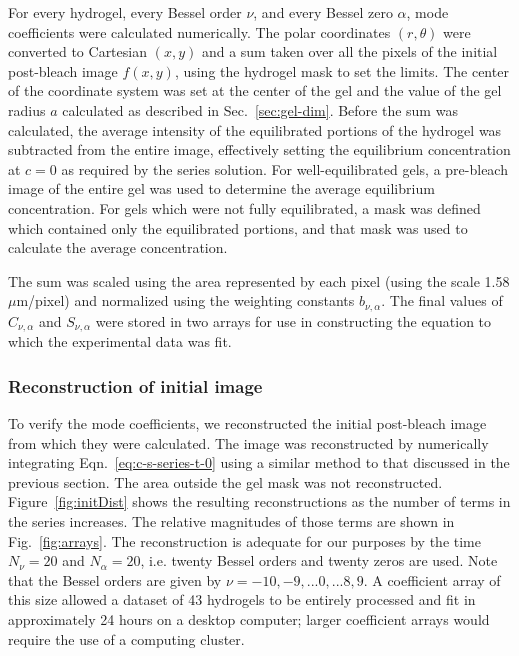 For every hydrogel, every Bessel order $\nu$, and every Bessel zero $\alpha$, mode coefficients were calculated numerically.  The polar coordinates $(r,\theta)$ were converted to Cartesian $(x,y)$ and a sum taken over all the pixels of the initial post-bleach image $f(x,y)$, using the hydrogel mask to set the limits.  The center of the coordinate system was set at the center of the gel and the value of the gel radius $a$ calculated as described in Sec.~\ref{sec:gel-dim}. Before the sum was calculated, the average intensity of the equilibrated portions of the hydrogel was subtracted from the entire image, effectively setting the equilibrium concentration at $c=0$ as required by the series solution.  For well-equilibrated gels, a pre-bleach image of the entire gel was used to determine the average equilibrium concentration.  For gels which were not fully equilibrated, a mask was defined which contained only the equilibrated portions, and that mask was used to calculate the average concentration.

The sum was scaled using the area represented by each pixel (using the scale 1.58 $\mu$m/pixel) and normalized using the weighting constants $b_{\nu,\alpha}$.  The final values of $C_{\nu,\alpha}$ and $S_{\nu,\alpha}$ were stored in two arrays for use in constructing the equation to which the experimental data was fit.


\subsubsection{Reconstruction of initial image}

To verify the mode coefficients, we reconstructed the initial post-bleach image from which they were calculated.  The image was reconstructed by numerically integrating Eqn.~\ref{eq:c-s-series-t-0} using a similar method to that discussed in the previous section.  The area outside the gel mask was not reconstructed.  Figure~\ref{fig:initDist} shows the resulting reconstructions as the number of terms in the series increases.  The relative magnitudes of those terms are shown in Fig.~\ref{fig:arrays}.  The reconstruction is adequate for our purposes by the time $N_\nu = 20$ and $N_\alpha = 20$, i.e. twenty Bessel orders and twenty zeros are used.  Note that the Bessel orders are given by $\nu = -10,-9, ...0, ...8,9$.  A coefficient array of this size allowed a dataset of 43 hydrogels to be entirely processed and fit in approximately 24 hours on a desktop computer; larger coefficient arrays would require the use of a computing cluster.

